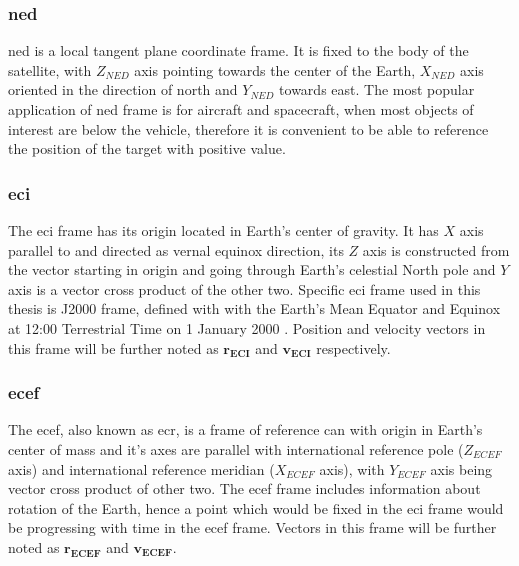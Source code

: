     \subsubsection{\ac*{ned}}
        \ac{ned} is a local tangent plane coordinate frame. It is fixed to the body of the satellite, with $Z_{NED}$ axis pointing towards the center of the Earth, $X_{NED}$ axis oriented in the direction of north and $Y_{NED}$ towards east. The most popular application of \ac{ned} frame is for aircraft and spacecraft, when most objects of interest are below the vehicle, therefore it is convenient to be able to reference the position of the target with positive value.

    \subsubsection{\ac*{eci}}
        The \ac{eci} frame has its origin located in Earth's center of gravity. It has $X$ axis parallel to and directed as vernal equinox direction, its $Z$ axis is constructed from the vector starting in origin and going through Earth's celestial North pole and $Y$ axis is a vector cross product of the other two. Specific \ac{eci} frame used in this thesis is J2000 frame, defined with with the Earth's Mean Equator and Equinox at 12:00 Terrestrial Time on 1 January 2000 \cite{schutz2004statistical}. Position and velocity vectors in this frame will be further noted as $\textbf{r}_\textbf{ECI}$ and $\textbf{v}_\textbf{ECI}$ respectively.

    \subsubsection{\ac*{ecef}}
        The \ac{ecef}, also known as \ac{ecr}, is a frame of reference can with origin in Earth's center of mass and it's axes are parallel with international reference pole ($Z_{ECEF}$ axis) and international reference meridian ($X_{ECEF}$ axis), with $Y_{ECEF}$ axis being vector cross product of other two. The \ac{ecef} frame includes information about rotation of the Earth, hence a point which would be fixed in the \ac{eci} frame would be progressing with time in the \ac{ecef} frame. Vectors in this frame will be further noted as $\textbf{r}_{\textbf{ECEF}}$ and $\textbf{v}_{\textbf{ECEF}} $.


